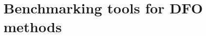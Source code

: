 \documentclass{polyu-presentation}
\newcommand{\obj}{f}
\begin{document}

\section{Benchmarking tools for DFO methods}
\end{document}
